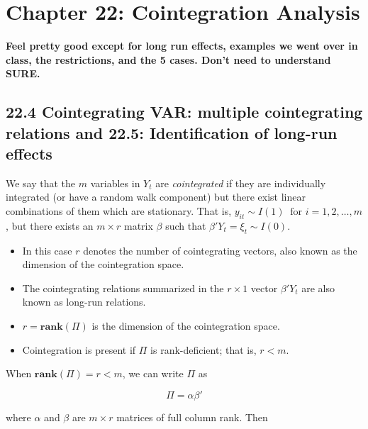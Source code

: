 %
%
%
%
%
%

\section{Chapter 22: Cointegration Analysis}

\textbf{Feel pretty good except for long run effects, examples we went over in class, the restrictions, and the 5 cases. Don't need to understand SURE.}

\subsection{22.4 Cointegrating VAR: multiple cointegrating relations and 22.5: Identification of long-run effects}\label{ts.pesaran.22.4}
\begin{definition}\label{ts.ch22.def.cointegrated} We say that the \(m\) variables in \(Y_t\) are \textit{cointegrated} if they are individually integrated (or have a random walk component) but there exist linear combinations of them which are stationary. That is, \(y_{it} \sim I(1) \ \text{ for } i = 1, 2, \ldots, m\), but there exists an \(m \times r\) matrix \(\beta\) such that \(\beta'Y_t = \xi_t \sim I(0)\). 
\end{definition}

\begin{itemize}

\item In this case \(r\) denotes the number of cointegrating vectors, also known as the dimension of the cointegration space. 

\item The cointegrating relations summarized in the \(r \times 1\) vector \(\beta'Y_t \) are also known as long-run relations.

\item \(r = \textbf{rank}(\Pi)\) is the dimension of the cointegration space. 

\item Cointegration is present if \(\Pi\) is rank-deficient; that is, \(r < m\).

\end{itemize}

When \(\textbf{rank}(\Pi) = r < m\), we can write \(\Pi\) as 

\begin{equation}\label{ts.eq.22.18}
\Pi = \alpha \beta'
\end{equation}

where \(\alpha\) and \(\beta\) are \(m \times r\) matrices of full column rank. Then

